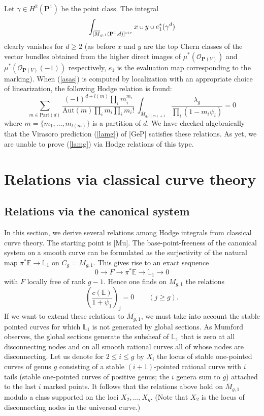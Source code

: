 \documentclass[11 pt]{amsart}
\newcommand{\proj}{\mathbf P}
\newcommand{\oh}{{\mathcal{O}}}
\def\scup{\mathbin{\text{\scriptsize$\cup$}}}
\newcommand{\LL}{\mathbb{L}}
\newcommand{\hodge}{\mathbb{E}}
\begin{document}
Let $\gamma \in H^2(\proj^1)$ be the point class.
The integral
\begin{equation}
\label{asas}
\int_{[\overline{M}_{g,1}(\proj^1,d)]^{vir}}
x\scup y \scup e_1^*(\gamma^{d})
\end{equation}
clearly vanishes for $d\geq 2$ 
(as before $x$ and $y$ are the top Chern classes
of the vector bundles obtained from the
higher direct images of $\mu^*(\oh_{\proj(V)})$
and $\mu^*(\oh_{\proj(V)}(-1))$ respectively, $e_1$
is the evaluation map corresponding to the marking).
When (\ref{asas}) is computed by localization
with an appropriate choice of linearization, the
following Hodge relation is found:
$$ \sum_{ m\in \text{Part}(d)}
\frac{(-1)^{d+l(m)}  \prod_i m_i^{m_i}}
{\text{Aut}(m) \prod_i m_i  \prod_i m_i!} 
\ \int_{\overline{M}_{g,l(m)+1}} \frac{\lambda_g}{\prod_i(1-m_i \psi_i)}=0$$
where $m=\{m_1, \ldots, m_{l(m)}\}$ is a partition
of $d$.
We have checked algebraically that the Virasoro prediction
(\ref{lamg}) of [GeP] satisfies these relations. As yet, we are unable
to prove (\ref{lamg}) via Hodge relations of this type.






\section{\bf{Relations via classical curve theory}}
\subsection{Relations via the canonical system}
In this section, we derive several relations among Hodge integrals
from classical curve theory. The starting point is [Mu].
The base-point-freeness of the canonical system on a smooth curve
can be formulated as the surjectivity of the natural map
$\pi^*\hodge\to\LL_1$ on $C_g=M_{g,1}$. This gives rise to an exact
sequence
$$0\to F\to\pi^*\hodge\to\LL_1\to0$$
with $F$ locally free of rank $g-1$.
Hence one finds on $M_{g,1}$ the relations
$$\left(\frac{c(\hodge)}{1+\psi_1}\right)_j=0\qquad(j\ge g).$$
If we want to extend these relations to 
$\overline{M}_{g,1}$,
we must take into account the stable pointed curves
for which $\LL_1$ is not generated by global sections. As Mumford observes,
the global sections generate the subsheaf of $\LL_1$ that is zero at
all disconnecting nodes and on all smooth rational curves all of whose nodes
are disconnecting. Let us denote for $2\le i\le g$ by $X_i$ the locus
of stable one-pointed curves of genus $g$ consisting of a stable
$(i+1)$-pointed rational curve with $i$ tails (stable one-pointed curves
of positive genus; the $i$ genera sum to $g$) attached to the last
$i$ marked points. It follows that the relations above hold on
$\overline{M}_{g,1}$ modulo a class supported on the loci 
$X_2, \dots, X_g$. (Note that $X_2$ is the locus of disconnecting nodes
in the universal curve.)
\end{document}
